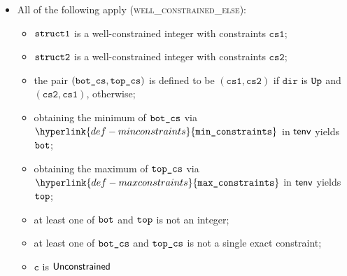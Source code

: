 \documentclass{book}
\newcommand\minconstraints[0]{\hyperlink{def-minconstraints}{\texttt{min\_constraints}}}
\newcommand\maxconstraints[0]{\hyperlink{def-maxconstraints}{\texttt{max\_constraints}}}
\newcommand\vc[0]{\texttt{c}}
\newcommand\dir[0]{\texttt{dir}}
\newcommand\csone[0]{\texttt{cs1}}
\newcommand\cstwo[0]{\texttt{cs2}}
\begin{document}
\begin{itemize}
  \item All of the following apply (\textsc{well\_constrained\_else}):
  \begin{itemize}
    \item $\texttt{struct1}$ is a well-constrained integer with constraints $\csone$;
    \item $\texttt{struct2}$ is a well-constrained integer with constraints $\cstwo$;
    \item the pair $(\texttt{bot\_cs}, \texttt{top\_cs})$ is defined to be $(\csone, \cstwo)$ if $\dir$ is $\texttt{Up}$ and $(\cstwo, \csone)$, otherwise;
    \item obtaining the minimum of $\texttt{bot\_cs}$ via $\minconstraints$ in $\textsf{tenv}$ yields $\texttt{bot}$;
    \item obtaining the maximum of $\texttt{top\_cs}$ via $\maxconstraints$ in $\textsf{tenv}$ yields $\texttt{top}$;
    \item at least one of $\texttt{bot}$ and $\texttt{top}$ is not an integer;
    \item at least one of $\texttt{bot\_cs}$ and $\texttt{top\_cs}$ is not a single exact constraint;
    \item $\vc$ is $\textsf{Unconstrained}$
  \end{itemize}
\end{itemize}
\end{document}
